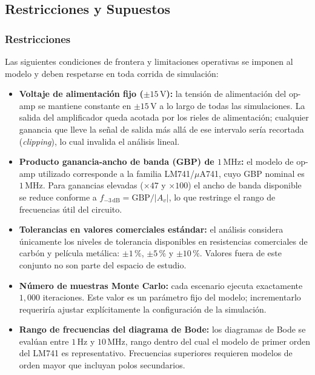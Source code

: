 ﻿\documentclass[12pt, letterpaper]{article}
\begin{document}
\subsection{Restricciones y Supuestos}

\subsubsection*{Restricciones}

Las siguientes condiciones de frontera y limitaciones operativas se imponen al
modelo y deben respetarse en toda corrida de simulación:

\begin{itemize}[leftmargin=2em]
    \item \textbf{Voltaje de alimentación fijo (\(\pm 15\,\text{V}\)):}
          la tensión de alimentación del op-amp se mantiene constante en
          \(\pm 15\,\text{V}\) a lo largo de todas las simulaciones. La salida del
          amplificador queda acotada por los rieles de alimentación; cualquier
          ganancia que lleve la señal de salida más allá de ese intervalo sería
          recortada (\textit{clipping}), lo cual invalida el análisis lineal.

    \item \textbf{Producto ganancia-ancho de banda (GBP) de \(1\,\text{MHz}\):}
          el modelo de op-amp utilizado corresponde a la familia LM741/\(\mu\)A741, %
          cuyo GBP nominal es \(1\,\text{MHz}\). Para ganancias elevadas
          (\(\times 47\) y \(\times 100\)) el ancho de banda disponible se reduce
          conforme a \(f_{-3\,\text{dB}} = \text{GBP}/|A_v|\), lo que restringe
          el rango de frecuencias útil del circuito.

    \item \textbf{Tolerancias en valores comerciales estándar:}
          el análisis considera únicamente los niveles de tolerancia disponibles
          en resistencias comerciales de carbón y película metálica:
          \(\pm 1\,\text{\%}\), \(\pm 5\,\text{\%}\) y \(\pm 10\,\text{\%}\).
          Valores fuera de este conjunto no son parte del espacio de estudio.

    \item \textbf{Número de muestras Monte Carlo:}
          cada escenario ejecuta exactamente \(1{,}000\) iteraciones. Este valor
          es un parámetro fijo del modelo; incrementarlo requeriría ajustar
          explícitamente la configuración de la simulación.

    \item \textbf{Rango de frecuencias del diagrama de Bode:}
          los diagramas de Bode se evalúan entre \(1\,\text{Hz}\) y
          \(10\,\text{MHz}\), rango dentro del cual el modelo de primer orden del
          LM741 es representativo. Frecuencias superiores requieren modelos de
          orden mayor que incluyan polos secundarios.
\end{itemize}
\end{document}
